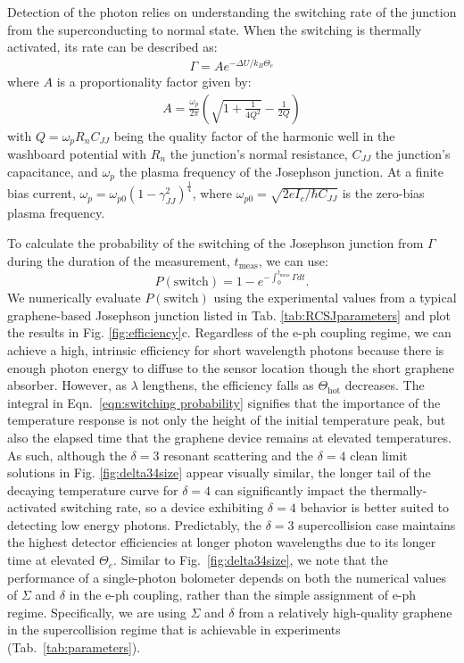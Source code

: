 \documentclass[aip, amsmath,amssymb, reprint]{revtex4-1}
\newcommand{\ba}{\begin{eqnarray}}
\newcommand{\ea}{\end{eqnarray}}
\begin{document}
Detection of the photon relies on understanding the switching rate of the junction from the superconducting to normal state. When the switching is thermally activated, its rate can be described as: \ba \Gamma = Ae^{-\Delta U/k_B\Theta_{e}}\label{eqn:SwitchingRate}\ea where $A$ is a proportionality factor given by: \ba A = \frac{\omega_{p}}{2\pi}\left(\sqrt{1 + \frac{1}{4Q^{2}}} - \frac{1}{2Q}\right)\ea with $Q = \omega_p R_n C_{JJ}$ being the quality factor of the harmonic well in the washboard potential with $R_n$ the junction's normal resistance, $C_{JJ}$ the junction's capacitance, and $\omega_p$ the plasma frequency of the Josephson junction. At a finite bias current, $\omega_p = \omega_{p0}(1-\gamma_{JJ}^2)^{\frac{1}{4}}$, where $\omega_{p0}= \sqrt{2eI_c/\hbar C_{JJ}}$ is the zero-bias plasma frequency. 

To calculate the probability of the switching of the Josephson junction from $\Gamma$ during the duration of the measurement, $t_{\text{meas}}$, we can use\cite{Walsh.2017}:
\begin{equation}
    P(\text{switch}) = 1 - e^{-\int_{0}^{t_{\text{meas}}} \Gamma dt}.
    \label{eqn:switching probability}
\end{equation} We numerically evaluate $P(\text{switch})$ using the experimental values from a typical graphene-based Josephson junction listed in Tab. \ref{tab:RCSJparameters} and plot the results in Fig. \ref{fig:efficiency}c. Regardless of the e-ph coupling regime, we can achieve a high, intrinsic efficiency for short wavelength photons because there is enough photon energy to diffuse to the sensor location though the short graphene absorber. However, as $\lambda$ lengthens, the efficiency falls as $\Theta_{\text{hot}}$ decreases. The integral in Eqn.\ \ref{eqn:switching probability} signifies that the importance of the temperature response is not only the height of the initial temperature peak, but also the elapsed time that the graphene device remains at elevated temperatures. As such, although the $\delta = 3$ resonant scattering and the $\delta = 4$ clean limit solutions in Fig. \ref{fig:delta34size} appear visually similar, the longer tail of the decaying temperature curve for $\delta = 4$ can significantly impact the thermally-activated switching rate, so a device exhibiting $\delta = 4$ behavior is better suited to detecting low energy photons. Predictably, the $\delta = 3$ supercollision case maintains the highest detector efficiencies at longer photon wavelengths due to its longer time at elevated $\Theta_e$. Similar to Fig.~\ref{fig:delta34size}, we note that the performance of a single-photon bolometer depends on both the numerical values of $\Sigma$ and $\delta$ in the e-ph coupling, rather than the simple assignment of e-ph regime. Specifically, we are using $\Sigma$ and $\delta$ from a relatively high-quality graphene in the supercollision regime that is achievable in experiments (Tab.~\ref{tab:parameters}).
\end{document}
